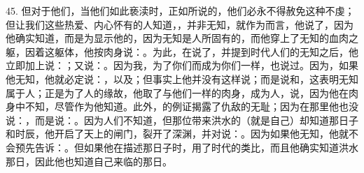 45. 但对于他们，当他们如此亵渎时，正如所说的，他们必永不得赦免这种不虔；但让我们这些热爱、内心怀有的人知道，，并非无知，就作为而言，他说了，因为他确实知道，而是为显示他的，因为无知是人所固有的，而他穿上了无知的血肉之躯，因着这躯体，他按肉身说：。为此，在说了，并提到时代人们的无知之后，他立即加上说：；又说：。因为我，为了你们而成为你们一样，也说过。因为，如果他无知，他就必定说：，以及；但事实上他并没有这样说；而是说和，这表明无知属于人；正是为了人的缘故，他取了与他们一样的肉身，成为人，说，因为他在肉身中不知，尽管作为他知道。此外，的例证揭露了仇敌的无耻；因为在那里他也没说：，而是说：。因为人们不知道，但那位带来洪水的（就是自己）却知道那日子和时辰，他开启了天上的闸门，裂开了深渊，并对说：。因为如果他无知，他就不会预先告诉：。但如果他在描述那日子时，用了时代的类比，而且他确实知道洪水那日，因此他也知道自己来临的那日。\par

